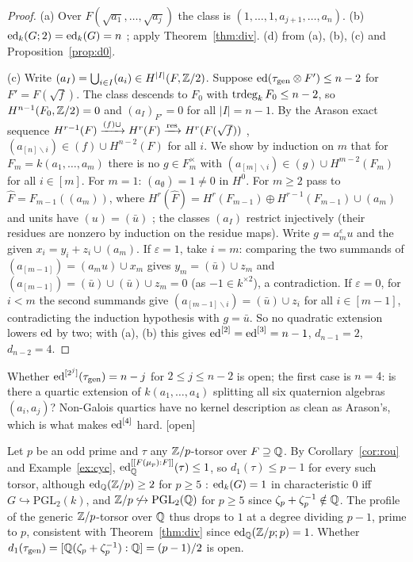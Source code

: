 \begin{proof}
(a) Over $F(\sqrt{a_1},\dots,\sqrt{a_j})$ the class is $(1,\dots,1,a_{j+1},\dots,a_n)$.
(b) $\operatorname{ed}_k(G;2)=\operatorname{ed}_k(G)=n$ \cite{BR,KM}; apply Theorem~\ref{thm:div}. (d) from (a),
(b), (c) and Proposition~\ref{prop:d0}.

(c) Write $(a_I)=\bigcup_{i\in I}(a_i)\in H^{|I|}(F,\mathbb Z/2)$. Suppose
$\operatorname{ed}(\tau_{\mathrm{gen}}\otimes F')\le n-2$ for $F'=F(\sqrt f)$. The class descends to $F_0$ with
$\operatorname{trdeg}_kF_0\le n-2$, so $H^{n-1}(F_0,\mathbb Z/2)=0$ \cite[II.4.2]{Se} and $(a_I)_{F'}=0$ for
all $|I|=n-1$. By the Arason exact sequence $H^{r-1}(F)\xrightarrow{(f)\cup}H^r(F)
\xrightarrow{\operatorname{res}}H^r(F(\sqrt f))$ \cite{Ar}, $(a_{[n]\smallsetminus i})\in(f)\cup
H^{n-2}(F)$ for all $i$. We show by induction on $m$ that for $F_m=k(a_1,\dots,a_m)$
there is no $g\in F_m^\times$ with $(a_{[m]\smallsetminus i})\in(g)\cup H^{m-2}(F_m)$
for all $i\in[m]$. For $m=1$: $(a_\emptyset)=1\ne0$ in $H^0$. For $m\ge2$ pass to
$\hat F=F_{m-1}((a_m))$, where $H^r(\hat F)=H^r(F_{m-1})\oplus H^{r-1}(F_{m-1})\cup(a_m)$
and units have $(u)=(\bar u)$ \cite[II.4.3]{Se}; the classes $(a_I)$ restrict
injectively (their residues are nonzero by induction on the residue maps). Write
$g=a_m^\varepsilon u$ and the given $x_i=y_i+z_i\cup(a_m)$. If $\varepsilon=1$, take
$i=m$: comparing the two summands of $(a_{[m-1]})=(a_mu)\cup x_m$ gives
$y_m=(\bar u)\cup z_m$ and $(a_{[m-1]})=(\bar u)\cup(\bar u)\cup z_m=0$ (as $-1\in
k^{\times2}$), a contradiction. If $\varepsilon=0$, for $i<m$ the second summands give
$(a_{[m-1]\smallsetminus i})=(\bar u)\cup z_i$ for all $i\in[m-1]$, contradicting the
induction hypothesis with $g=\bar u$. So no quadratic extension lowers $\operatorname{ed}$ by two;
with (a), (b) this gives $\operatorname{ed}^{[2]}=\operatorname{ed}^{[3]}=n-1$, $d_{n-1}=2$, $d_{n-2}=4$.
\end{proof}

\begin{remark}
Whether $\operatorname{ed}^{[2^j]}(\tau_{\mathrm{gen}})=n-j$ for $2\le j\le n-2$ is open; the first case is
$n=4$: is there a quartic extension of $k(a_1,\dots,a_4)$ splitting all six quaternion
algebras $(a_i,a_j)$? Non-Galois quartics have no kernel description as clean as
Arason's, which is what makes $\operatorname{ed}^{[4]}$ hard. [open]
\end{remark}

\begin{example}[$\Z/p$ over $\Q$]\label{ex:Zp}
Let $p$ be an odd prime and $\tau$ any $\Z/p$-torsor over $F\supseteq\mathbb Q$. By
Corollary~\ref{cor:rou} and Example~\ref{ex:cyc}, $\operatorname{ed}^{[[F(\mu_p):F]]}_\mathbb Q(\tau)\le1$,
so $d_1(\tau)\le p-1$ for every such torsor, although $\operatorname{ed}_\mathbb Q(\mathbb Z/p)\ge2$ for
$p\ge5$ \cite{Le07}: $\operatorname{ed}_k(G)=1$ in characteristic $0$ iff $G\hookrightarrow
\mathrm{PGL}_2(k)$, and $\mathbb Z/p\not\hookrightarrow\mathrm{PGL}_2(\mathbb Q)$ for $p\ge5$
since $\zeta_p+\zeta_p^{-1}\notin\mathbb Q$. The profile of the generic $\Z/p$-torsor over
$\Q$ thus drops to $1$ at a degree dividing $p-1$, prime to $p$, consistent with
Theorem~\ref{thm:div} since $\operatorname{ed}_\mathbb Q(\mathbb Z/p;p)=1$. Whether $d_1(\tau_{\mathrm{gen}})=
[\mathbb Q(\zeta_p+\zeta_p^{-1}):\mathbb Q]=(p-1)/2$ is open.
\end{example}

